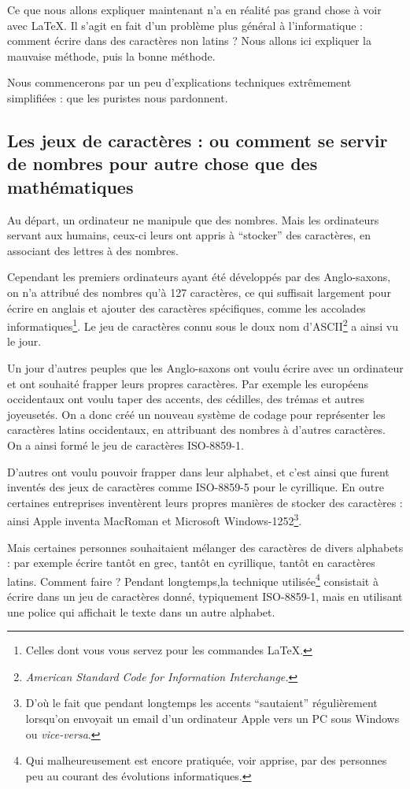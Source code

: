 Ce que nous allons expliquer maintenant n'a en réalité pas grand chose à voir avec \LaTeX. Il s'agit en fait d'un problème plus général à l'informatique : comment écrire dans des caractères non latins ? Nous allons ici expliquer la mauvaise méthode, puis la bonne méthode.

Nous commencerons par un peu d'explications techniques extrêmement simplifiées : que les puristes nous pardonnent.

\subsection{Les jeux de caractères : ou comment se servir de nombres pour autre chose que des mathématiques}

Au départ, un ordinateur ne manipule que des nombres. Mais les ordinateurs servant aux humains, ceux-ci leurs ont appris à \enquote{stocker} des caractères, en associant des lettres à des nombres.

Cependant les premiers ordinateurs ayant été développés par des Anglo-saxons, on n'a  attribué des nombres qu'à  127 caractères, ce qui suffisait largement pour écrire en anglais et ajouter des caractères spécifiques, comme les accolades informatiques\footnote{Celles dont vous vous servez pour les commandes \LaTeX.}.  Le jeu de caractères connu sous le doux nom d'ASCII\footnote{\emph{\textenglish{American Standard Code for Information Interchange.}}} a ainsi vu le jour.

Un jour d'autres peuples que les Anglo-saxons ont voulu écrire avec un ordinateur et ont souhaité frapper leurs propres caractères. Par exemple les européens occidentaux ont voulu taper des accents, des cédilles, des trémas et autres joyeusetés. On a donc créé un nouveau système de codage pour représenter les caractères latins occidentaux, en attribuant des nombres à d'autres caractères. On a ainsi formé le jeu de caractères  ISO-8859-1. 

D'autres ont voulu pouvoir frapper dans leur alphabet, et c'est ainsi que furent inventés des jeux de caractères comme ISO-8859-5 pour le cyrillique. En outre certaines entreprises inventèrent leurs propres manières de stocker des caractères :  ainsi Apple inventa MacRoman et Microsoft Windows-1252\footnote{D'où le fait que pendant longtemps les accents \enquote{sautaient} régulièrement lorsqu'on envoyait un email d'un ordinateur Apple vers un PC sous Windows ou \emph{vice-versa}.}. 

Mais certaines personnes souhaitaient mélanger des caractères de divers alphabets : par exemple écrire tantôt en grec, tantôt en cyrillique, tantôt en caractères latins. Comment faire ? Pendant longtemps,la technique utilisée\footnote{Qui malheureusement est encore pratiquée, voir apprise, par des personnes peu au courant des évolutions informatiques.} consistait à écrire dans un jeu de caractères donné, typiquement ISO-8859-1, mais en utilisant une police qui affichait le texte dans un autre alphabet. 

